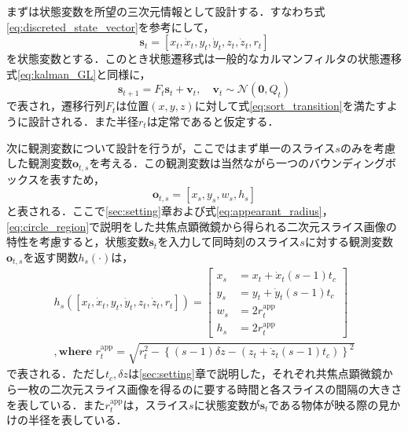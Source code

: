    まずは状態変数を所望の三次元情報として設計する．すなわち式\ref{eq:discreted_state_vector}を参考にして，
    \begin{equation}
        \label{eq:skf_state_vector}
        \bm{s}_t = \left[x_t, \dot{x}_t, y_t, \dot{y}_t, z_t, \dot{z}_t, r_t\right]
    \end{equation}
    を状態変数とする．このとき状態遷移式は一般的なカルマンフィルタの状態遷移式\ref{eq:kalman_GL}と同様に，
    \begin{equation}
        \label{eq:skf_state_transition}
        \bm{s}_{t+1} = F_t \bm{s}_t + \bm{v}_t, \quad \bm{v}_t \sim \mathcal{N}(\bm{0}, Q_t)
    \end{equation}
    で表され，遷移行列$F_t$は位置$(x,y,z)$に対して式\ref{eq:sort_transition}を満たすように設計される．また半径$r_t$は定常であると仮定する．

    次に観測変数について設計を行うが，ここではまず単一のスライス$s$のみを考慮した観測変数$\bm{o}_{t, s}$を考える．この観測変数は当然ながら一つのバウンディングボックスを表すため，
    \begin{equation}
        \label{eq:single_slice_observation}
        \bm{o}_{t, s} = \left[x_s, y_s, w_s, h_s\right]
    \end{equation}
    と表される．ここで\ref{sec:setting}章および式\ref{eq:appearant_radius}，\ref{eq:circle_region}で説明をした共焦点顕微鏡から得られる二次元スライス画像の特性を考慮すると，状態変数$\bm{s}_t$を入力して同時刻のスライス$s$に対する観測変数$\bm{o}_{t,s}$を返す関数$h_s(\cdot)$は，
    \begin{equation}
        \label{eq:single_slice_observation_map}
        \begin{gathered}
            h_s(\left[x_t, \dot{x}_t, y_t, \dot{y}_t, z_t, \dot{z}_t, r_t\right]) = \left[
                \begin{aligned}
                    x_s &= x_t + \dot{x}_t (s - 1) t_c
                    \\ y_s &= y_t + \dot{y}_t (s - 1) t_c
                    \\ w_s &= 2r_t^{\text{app}}
                    \\ h_s &= 2r_t^{\text{app}}
                \end{aligned}
                \right]
            \\  ,\textbf{where } r_t^{\text{app}} = \sqrt{r_t^2 - \left\{(s - 1)\delta z - \left(z_t + \dot{z}_t (s - 1) t_c\right) \right\}^2}
        \end{gathered}
    \end{equation}
    で表される．ただし$t_c, \delta z$は\ref{sec:setting}章で説明した，それぞれ共焦点顕微鏡から一枚の二次元スライス画像を得るのに要する時間と各スライスの間隔の大きさを表している．また$r_t^{\text{app}}$は，スライス$s$に状態変数が$\bm{s}_t$である物体が映る際の見かけの半径を表している．

